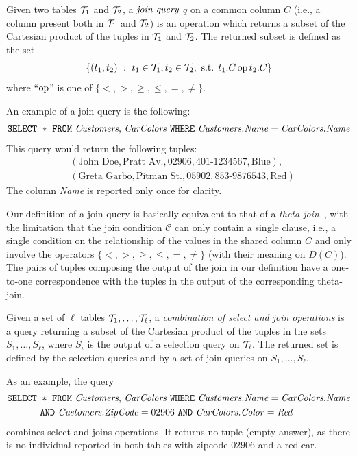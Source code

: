 \begin{definition}\label{def:joinquery}
  Given two tables ${\cal T}_1$ and ${\cal T}_2$, a $\emph{join query}$ $q$ on a common
  column $C$ (i.e., a column present both in ${\cal T}_1$ and ${\cal T}_2$) is an
  operation which returns a subset of the Cartesian product of the tuples in
  ${\cal T}_1$ and ${\cal T}_2$. The returned subset is defined as the set
  \[
  \{(t_1,t_2) ~:~ t_1\in{\cal T}_1, t_2\in{\cal T}_2, \mbox{ s.t. } t_1.C \operatorname{op} t_2.C \}\]
  where ``$\operatorname{op}$'' is one of $\{<,>,\ge,\le,=,\neq\}$.
\end{definition}

An example of a join query is the following:
\[
\mbox{\texttt{SELECT} } * \mbox{ \texttt{FROM} \emph{Customers}, \emph{CarColors} \texttt{WHERE}
\emph{Customers.Name}} = \mbox{\emph{CarColors.Name}}
\]
This query would return the following tuples:
\begin{align*}
  &(\mbox{John Doe}, \mbox{Pratt Av.}, \mbox{02906}, \mbox{401-1234567}, \mbox{Blue}), \\
  &(\mbox{Greta Garbo}, \mbox{Pitman St.}, \mbox{05902}, \mbox{853-9876543}, \mbox{Red})
\end{align*}
The column \emph{Name} is reported only once for clarity.

Our definition of a join query is basically equivalent to that of a
\emph{theta-join}~\citep[Sect.5.2.7]{GarciaMolinaUW02}, with the limitation that
the join condition $\mathcal{C}$ can only contain a single clause, i.e., a single
condition on the relationship of the values in the shared column $C$ and only
involve the operators $\{<,>,\ge,\le,=,\neq\}$ (with their meaning on $D(C)$).
The pairs of tuples composing the output of the join in our definition have a
one-to-one correspondence with the tuples in the output of the corresponding
theta-join.

\begin{definition}\label{def:general query}
  Given a set of $\ell$ tables ${\cal T}_1,\dotsc,{\cal T}_\ell$, a
  \emph{combination of select and join operations} is a query returning a subset
  of the Cartesian product of the tuples in the sets $S_1,\dotsc,S_\ell$, where
  $S_i$ is the output of a selection query on ${\cal T}_i$. The returned set is
  defined by the selection queries and by a set of join queries on
  $S_1,\dotsc,S_\ell$.
\end{definition}
As an example, the query 
\begin{align*}
\mbox{\texttt{SELECT} } &* \mbox{ \texttt{FROM} \emph{Customers},
\emph{CarColors} \texttt{WHERE} 
\emph{Customers.Name}} = \mbox{\emph{CarColors.Name}} \\
& \mbox{\texttt{AND} \emph{Customers.ZipCode}}=02906 \mbox{ \texttt{AND}
\emph{CarColors.Color}}=\mbox{\emph{Red}}
\end{align*}
combines select and joins operations. It returns no tuple (empty answer), as
there is no individual reported in both tables with zipcode $02906$ and a red
car.

